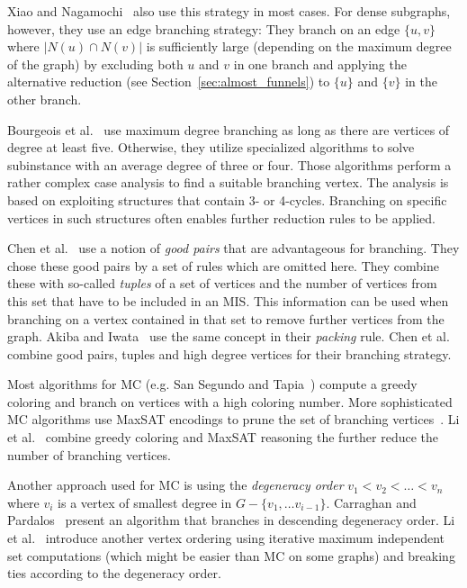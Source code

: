 \documentclass[a4paper,UKenglish,cleveref, autoref, thm-restate]{lipics-v2021}
\begin{document}
Xiao and Nagamochi~\cite{XiaoNagamochi} also use
this strategy in most cases. For dense subgraphs, however, they use an edge
branching strategy: They branch on an edge $\{u, v\}$ where $|N(u) \cap N(v)|$
is sufficiently large (depending on the maximum degree of the graph) by
excluding both $u$ and $v$ in one branch and applying the alternative reduction
(see Section~\ref{sec:almost_funnels}) to $\{u\}$ and $\{v\}$ in the other branch.

Bourgeois et al.~\cite{Bourgeois} use maximum degree branching as long as there are vertices of degree at least five. Otherwise, they utilize specialized algorithms to solve subinstance with an average degree of three or four. Those algorithms perform a rather complex case analysis to find a suitable branching vertex. The analysis is based on exploiting structures that contain 3- or 4-cycles. Branching on specific vertices in such structures often enables further reduction rules to be applied.

Chen et al.~\cite{ChenXiaKanj} use a notion of \emph{good pairs} that are advantageous
for branching. They chose these good pairs by a set of rules which are omitted
here. They combine these with so-called \emph{tuples} of a set of vertices and the
number of vertices from this set that have to be included in an MIS. This
information can be used when branching on a vertex
contained in that set to remove further vertices from the graph. Akiba and
Iwata~\cite{AkibaIwata} use the same concept in their \emph{packing} rule. Chen
et al. combine good pairs, tuples and high degree vertices for their branching strategy.

Most algorithms for MC (e.g. San Segundo and Tapia~\cite{Color}) compute a
greedy coloring and branch on vertices with a high coloring number.
More sophisticated MC algorithms use MaxSAT encodings to prune the set of
branching vertices~\cite{LiFangXu,LiJiang,LiQuan}. Li et al.~\cite{LiMaxSat}
combine greedy coloring and MaxSAT reasoning the further reduce the number of
branching vertices.

Another approach used for MC is using the \emph{degeneracy order} $v_1 < v_2 <
\dots < v_n$ where $v_i$ is a vertex of smallest degree in $G - \{v_1, \dots
v_{i-1}\}$. Carraghan and Pardalos~\cite{CarraghanPardalos} present an algorithm
that branches in descending degeneracy order. Li et al.~\cite{LiFangXu}
introduce another vertex ordering using iterative maximum independent set
computations (which might be easier than MC on some graphs) and breaking ties
according to the degeneracy order.
\end{document}
